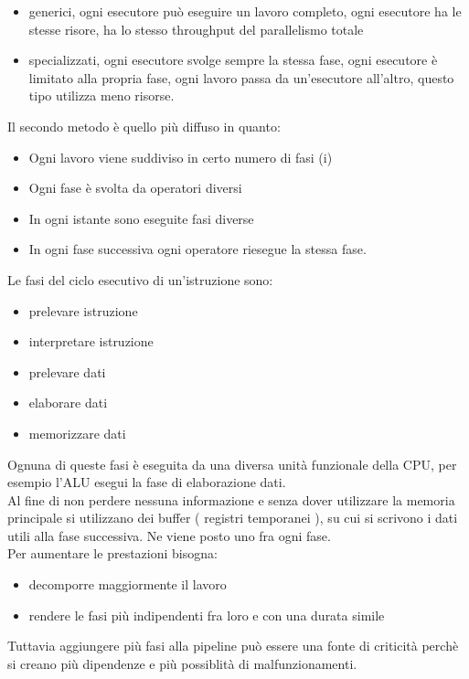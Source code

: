 \documentclass[arch.tex]{subfiles}
\begin{document}
\begin{itemize}
	\item generici, ogni esecutore può eseguire un lavoro completo,
		ogni esecutore ha le stesse risore, ha lo stesso throughput del
		parallelismo totale
	\item specializzati, ogni esecutore svolge sempre la stessa fase,
		ogni esecutore è limitato alla propria fase, ogni lavoro passa 
		da un'esecutore all'altro, questo tipo utilizza meno risorse.
\end{itemize}
Il secondo metodo è quello più diffuso in quanto:

\begin{itemize}
	\item Ogni lavoro viene suddiviso in certo numero di fasi (i)
	\item Ogni fase è svolta da operatori diversi
	\item In ogni istante sono eseguite fasi diverse
	\item In ogni fase successiva ogni operatore riesegue la stessa fase.
\end{itemize}
Le fasi del ciclo esecutivo di un'istruzione sono:

\begin{itemize}
	\item prelevare istruzione
	\item interpretare istruzione
	\item prelevare dati
	\item elaborare dati
	\item memorizzare dati
\end{itemize}
Ognuna di queste fasi è eseguita da una diversa unità funzionale della CPU,
per esempio l'ALU esegui la fase di elaborazione dati.\\
Al fine di non perdere nessuna informazione e senza dover utilizzare la memoria 
principale si utilizzano dei buffer ( registri temporanei ), su cui si scrivono 
i dati utili alla fase successiva. Ne viene posto uno fra ogni fase.\\
Per aumentare le prestazioni bisogna:

\begin{itemize}
	\item decomporre maggiormente il lavoro
	\item rendere le fasi più indipendenti fra loro e con
		una durata simile
\end{itemize}
Tuttavia aggiungere più fasi alla pipeline può essere una fonte di criticità 
perchè si creano più dipendenze e più possiblità di malfunzionamenti.
\end{document}
